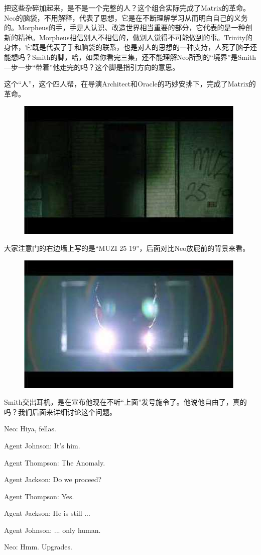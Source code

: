 \documentclass{ctexart}
\newenvironment{myquote}{\color{green} \setlength{\leftskip}{6em} \setlength{\rightskip}{4em} \setlength{\parindent}{-2em}}{\par}
\begin{document}
把这些杂碎加起来，是不是一个完整的人？这个组合实际完成了Matrix的革命。Neo的脑袋，不用解释，代表了思想，它是在不断理解学习从而明白自己的义务的。Morpheus的手，手是人认识、改造世界相当重要的部分，它代表的是一种创新的精神。Morpheus相信别人不相信的，做别人觉得不可能做到的事。Trinity的身体，它既是代表了手和脑袋的联系，也是对人的思想的一种支持，人死了脑子还能想吗？Smith的脚，哈，如果你看完三集，还不能理解Neo所到的“境界”是Smith—步一步“带着”他走完的吗？这个脚是指引方向的意思。

这个“人”，这个四人帮，在导演Architect和Oracle的巧妙安排下，完成了Matrix的革命。

\begin{figure}[htb]
\centering
\includegraphics[width=0.5\linewidth]{fig/read_reloaded-20}
\end{figure}

大家注意门的右边墙上写的是“MUZI 25 19”，后面对比Neo放屁前的背景来看。

\begin{figure}[htb]
\centering
\includegraphics[width=0.5\linewidth]{fig/read_reloaded-21}
\end{figure}

Smith交出耳机，是在宣布他现在不听“上面”发号施令了。他说他自由了，真的吗？我们后面来详细讨论这个问题。

\begin{myquote}
Neo: Hiya, fellas.

Agent Johnson: It's him.

Agent Thompson: The Anomaly.

Agent Jackson: Do we proceed?

Agent Thompson: Yes.

Agent Jackson: He is still ...

Agent Johnson: ... only human.

Neo: Hmm. Upgrades.
\end{myquote}
\end{document}
